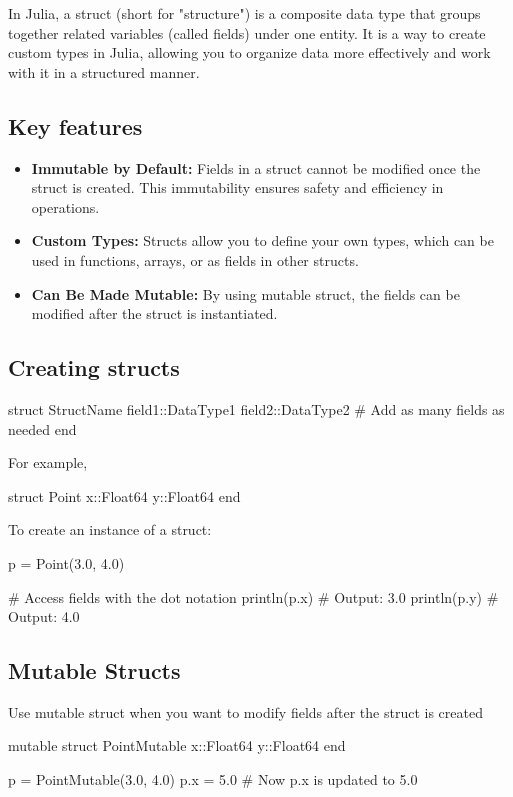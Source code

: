 \documentclass{report}
\begin{document}
     \pagebreak 
     \bigbreak \noindent 
     In Julia, a struct (short for "structure") is a composite data type that groups together related variables (called fields) under one entity. It is a way to create custom types in Julia, allowing you to organize data more effectively and work with it in a structured manner.
     \bigbreak \noindent 
     \subsection{Key features}
     \bigbreak \noindent 
     \begin{itemize}
         \item \textbf{Immutable by Default:} Fields in a struct cannot be modified once the struct is created. This immutability ensures safety and efficiency in operations.
         \item \textbf{Custom Types:} Structs allow you to define your own types, which can be used in functions, arrays, or as fields in other structs.
         \item \textbf{Can Be Made Mutable:} By using mutable struct, the fields can be modified after the struct is instantiated.
     \end{itemize}

     \bigbreak \noindent 
     \subsection{Creating structs}
     \bigbreak \noindent 
     \begin{jlcode}
         struct StructName
             field1::DataType1
             field2::DataType2
             # Add as many fields as needed
         end
     \end{jlcode}
     \bigbreak \noindent 
     For example,
     \bigbreak \noindent 
     \begin{jlcode}
         struct Point
             x::Float64
             y::Float64
         end
     \end{jlcode}
     \bigbreak \noindent 
     To create an instance of a struct:
     \bigbreak \noindent 
     \begin{jlcode}
     p = Point(3.0, 4.0)

     # Access fields with the dot notation
     println(p.x)  # Output: 3.0
     println(p.y)  # Output: 4.0
     \end{jlcode}

     \bigbreak \noindent 
     \subsection{Mutable Structs}
     \bigbreak \noindent 
     Use mutable struct when you want to modify fields after the struct is created
     \bigbreak \noindent 
     \begin{jlcode}
         mutable struct PointMutable
             x::Float64
             y::Float64
         end

         p = PointMutable(3.0, 4.0)
         p.x = 5.0  # Now p.x is updated to 5.0
     \end{jlcode}
\end{document}
